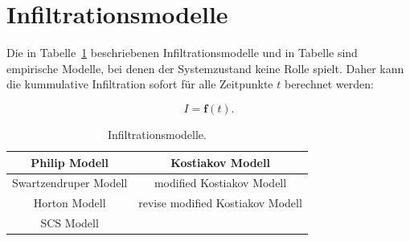 \documentclass[german,masthyd,utf8,lof,lot,hyperref,nomencl]{ihmpub}
\begin{document}
\section{Infiltrationsmodelle}

Die in Tabelle~\ref{tab:tab1} beschriebenen Infiltrationsmodelle
und in Tabelle sind empirische Modelle, bei denen der Systemzustand
keine Rolle spielt. Daher kann die kummulative Infiltration sofort
für alle Zeitpunkte $t$ berechnet werden:

\begin{equation}
I=\boldsymbol{f}(t).
\end{equation}
\begin{table}[h!]
\caption{Infiltrationsmodelle.}\label{tab:tab1}
\begin{centering}
\begin{tabular}{|c|c|}
\hline 
Philip Modell & Kostiakov Modell\tabularnewline
\hline 
Swartzendruper Modell & modified Kostiakov Modell\tabularnewline
\hline 
Horton Modell & revise modified Kostiakov Modell\tabularnewline
\hline 
SCS Modell & \tabularnewline
\hline 
\end{tabular}
\par\end{centering}
\end{table}

\end{document}
